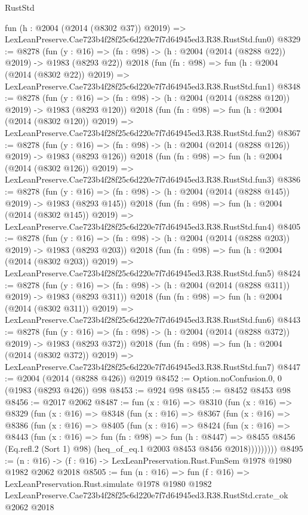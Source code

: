 \begin{lexlean}{RustStd}
\begin{coremodule}
    fun (h : @2004 (@2014 (@8302 @37)) @2019) =>
    LexLeanPreserve.Cae723b4f28f25c6d220e7f7d64945ed3.R38.RustStd.fun0)
@8329 := @8278
    (fun (y : @16) => (fn : @98) -> (h : @2004 (@2014 (@8288 @22)) @2019) -> @1983 (@8293 @22))
    @2018
    (fun (fn : @98) =>
    fun (h : @2004 (@2014 (@8302 @22)) @2019) =>
    LexLeanPreserve.Cae723b4f28f25c6d220e7f7d64945ed3.R38.RustStd.fun1)
@8348 := @8278
    (fun (y : @16) => (fn : @98) -> (h : @2004 (@2014 (@8288 @120)) @2019) -> @1983 (@8293 @120))
    @2018
    (fun (fn : @98) =>
    fun (h : @2004 (@2014 (@8302 @120)) @2019) =>
    LexLeanPreserve.Cae723b4f28f25c6d220e7f7d64945ed3.R38.RustStd.fun2)
@8367 := @8278
    (fun (y : @16) => (fn : @98) -> (h : @2004 (@2014 (@8288 @126)) @2019) -> @1983 (@8293 @126))
    @2018
    (fun (fn : @98) =>
    fun (h : @2004 (@2014 (@8302 @126)) @2019) =>
    LexLeanPreserve.Cae723b4f28f25c6d220e7f7d64945ed3.R38.RustStd.fun3)
@8386 := @8278
    (fun (y : @16) => (fn : @98) -> (h : @2004 (@2014 (@8288 @145)) @2019) -> @1983 (@8293 @145))
    @2018
    (fun (fn : @98) =>
    fun (h : @2004 (@2014 (@8302 @145)) @2019) =>
    LexLeanPreserve.Cae723b4f28f25c6d220e7f7d64945ed3.R38.RustStd.fun4)
@8405 := @8278
    (fun (y : @16) => (fn : @98) -> (h : @2004 (@2014 (@8288 @203)) @2019) -> @1983 (@8293 @203))
    @2018
    (fun (fn : @98) =>
    fun (h : @2004 (@2014 (@8302 @203)) @2019) =>
    LexLeanPreserve.Cae723b4f28f25c6d220e7f7d64945ed3.R38.RustStd.fun5)
@8424 := @8278
    (fun (y : @16) => (fn : @98) -> (h : @2004 (@2014 (@8288 @311)) @2019) -> @1983 (@8293 @311))
    @2018
    (fun (fn : @98) =>
    fun (h : @2004 (@2014 (@8302 @311)) @2019) =>
    LexLeanPreserve.Cae723b4f28f25c6d220e7f7d64945ed3.R38.RustStd.fun6)
@8443 := @8278
    (fun (y : @16) => (fn : @98) -> (h : @2004 (@2014 (@8288 @372)) @2019) -> @1983 (@8293 @372))
    @2018
    (fun (fn : @98) =>
    fun (h : @2004 (@2014 (@8302 @372)) @2019) =>
    LexLeanPreserve.Cae723b4f28f25c6d220e7f7d64945ed3.R38.RustStd.fun7)
@8447 := @2004 (@2014 (@8288 @426)) @2019
@8452 := Option.noConfusion.{0, 0} (@1983 (@8293 @426)) @98
@8453 := @924 @98
@8455 := @8452 @8453 @98
@8456 := @2017 @2062
@8487 := fun (x : @16) =>
  @8310
    (fun (x : @16) =>
    @8329
      (fun (x : @16) =>
      @8348
        (fun (x : @16) =>
        @8367
          (fun (x : @16) =>
          @8386
            (fun (x : @16) =>
            @8405
              (fun (x : @16) =>
              @8424
                (fun (x : @16) =>
                @8443
                  (fun (x : @16) =>
                  fun (fn : @98) =>
                  fun (h : @8447) =>
                  @8455
                    @8456
                    (Eq.refl.{2} (Sort 1) @98)
                    (heq_of_eq.{1} @2003 @8453 @8456 @2018)))))))))
@8495 := (n : @16) -> (f : @16) -> LexLeanPreservation.Rust.FunSem @1978 @1980 @1982 @2062 @2018
@8505 := fun (n : @16) =>
  fun (f : @16) =>
  LexLeanPreservation.Rust.simulate
    @1978
    @1980
    @1982
    LexLeanPreserve.Cae723b4f28f25c6d220e7f7d64945ed3.R38.RustStd.crate_ok
    @2062
    @2018
\end{coremodule}
\end{lexlean}
